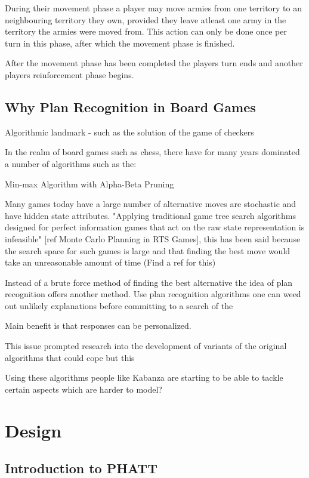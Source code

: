 \documentclass[parskip]{cs4rep}
\begin{document}
During their movement phase a player may move armies from one territory to an neighbouring territory they own, provided they leave atleast one army in the territory the armies were moved from. This action can only be done once per turn in this phase, after which the movement phase is finished.

After the movement phase has been completed the players turn ends and another players reinforcement phase begins.
\newpage

\section{Why Plan Recognition in Board Games}

Algorithmic landmark - such as the solution of the game of checkers 

In the realm of board games such as chess, there have for many years dominated a number of algorithms such as the:

Min-max Algorithm with Alpha-Beta Pruning

Many games today have a large number of alternative moves are stochastic and have hidden state attributes. "Applying traditional game tree search algorithms designed for perfect information games that act on the raw state representation is infeasible" [ref Monte Carlo Planning in RTS Games], this has been said because the search space for such games is large and that finding the best move would take an unreasonable amount of time (Find a ref for this)

Instead of a brute force method of finding the best alternative the idea of plan recognition offers another method. Use plan recognition algorithms one can weed out unlikely explanations before committing to a search of the 

Main benefit is that responses can be personalized.

This issue prompted research into the development of variants of the original algorithms that could cope but this 

Using these algorithms people like Kabanza are starting to be able to tackle certain aspects which are harder to model?

\chapter{Design}

\section{Introduction to PHATT}
\end{document}
